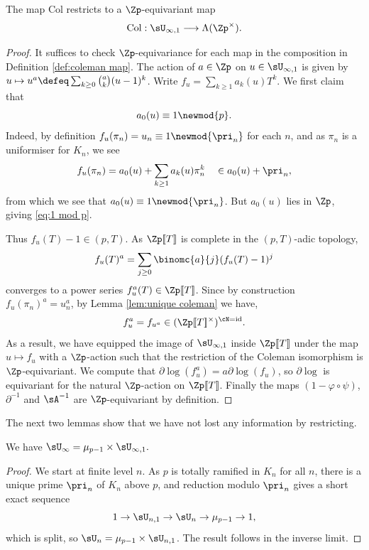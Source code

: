 \documentclass[a4paper,10pt, english, reqno]{smfart}
\newcommand{\lsem}{[\! [}
\newcommand{\rsem}{]\! ]}
\numberwithin{equation}{section}
\begin{document}
\begin{proposition}
	The map $\mathrm{Col}$ restricts to a $\Zp$-equivariant map
	\[
	\mathrm{Col} : \sU_{\infty,1} \longrightarrow \Lambda(\Zp^\times).
	\]
\end{proposition}
\begin{proof}
	It suffices to check $\Zp$-equivariance for each map in the composition in Definition \ref{def:coleman map}. 	The action of $a \in \Zp$ on $u \in \sU_{\infty,1}$ is given by $u \mapsto u^a \defeq \sum_{k \geq 0} {a \choose k} (u-1)^k$. Write $f_u = \sum_{k \geq 1}a_k(u) T^k$. We first claim that 
	\begin{equation}\label{eq:1 mod p}
	a_0(u) \equiv 1 \newmod{p}.
	\end{equation}
	Indeed, by definition $f_u(\pi_n) = u_n \equiv 1 \newmod{\pri_n}$ for each $n$, and as $\pi_n$ is a uniformiser for $K_n$, we see 
	\[
	f_u(\pi_n) = a_0(u) + \sum_{k\geq 1}a_k(u) \pi_n^k \ \ \ \in a_0(u) + \pri_n,
	\]
	from which we see that $a_0(u) \equiv 1 \newmod{\pri_n}$. But $a_0(u)$ lies in $\Zp$, giving \eqref{eq:1 mod p}.
	
	Thus $f_u(T) - 1 \in (p,T)$. As $\Zp\lsem T\rsem $ is complete in the $(p,T)$-adic topology,
	\[
	f_u(T)^a = \sum_{j \geq 0}\binomc{a}{j} (f_u(T)-1)^j
	\]
	converges to a power series $f_u^a(T) \in \Zp\lsem T\rsem $. Since by construction $f_u(\pi_n)^a = u_n^a$, by Lemma \ref{lem:unique coleman} we have, 
	\[
	f_{u}^a = f_{u^a} \in (\Zp\lsem T\rsem ^\times)^{\cN=\mathrm{id}}.
	\]
	As a result, we have equipped the image of $\sU_{\infty,1}$ inside $\Zp\lsem T\rsem$ under the map $u \mapsto f_u$ with a $\Zp$-action such that the restriction of the Coleman isomorphism is $\Zp$-equivariant. We compute that $\partial\log(f_u^a) = a\partial\log(f_u)$, so $\partial\log$ is equivariant for the natural $\Zp$-action on $\Zp\lsem T\rsem $. Finally the maps $(1- \varphi\circ\psi)$, $\partial^{-1}$ and $\sA^{-1}$ are $\Zp$-equivariant by definition.
\end{proof}

The next two lemmas show that we have not lost any information by restricting.
\begin{lemma}
	We have $\sU_\infty = \mu_{p-1} \times \sU_{\infty,1}.$
\end{lemma}
\begin{proof}
	We start at finite level $n$. As $p$ is totally ramified in $K_n$ for all $n$, there is a unique prime $\pri_n$ of $K_n$ above $p$, and reduction modulo $\pri_n$ gives a short exact sequence
	\[
	1 \to \sU_{n,1} \to \sU_{n} \to \mu_{p-1} \to 1,
	\]
	which is split, so $\sU_{n} = \mu_{p-1} \times \sU_{n,1}$. The result follows in the inverse limit.
\end{proof}
\end{document}
